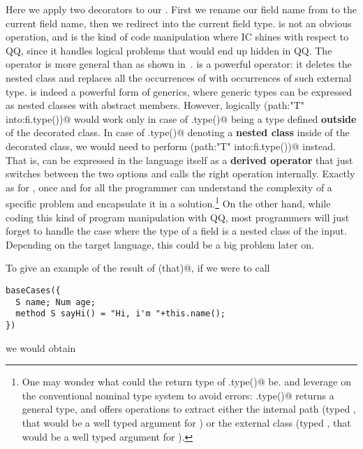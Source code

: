 \noindent Here we apply two decorators to our \Q@baseTrait@. First
we rename our field name from \Q@f@ to the current field name, then
 we redirect \Q@T@ into the current field type.
 \Q@RedirectType@ is not an obvious operation, and is the kind of code manipulation where IC shines
with respect to QQ, since it handles logical problems that would end up hidden in QQ.
 The operator \Q@RedirectType@ is more general than \Q@Redirect@ as shown in~\cite{servetto2014meta}.
 \Q@Redirect@ is a powerful operator:
 it deletes the nested class \Q@T@ and replaces all
 the occurrences of \Q@T@ with occurrences of such external type.
 \Q@Redirect@ is indeed a powerful form of generics,
 where generic types can be expressed as nested classes with abstract members.
 However, logically \Q@Redirect(path:"T" into:fi.type())@
 would work only in case of \Q@fi.type()@ being a type
 defined \textbf{outside} of the decorated class.
 In case of \Q@fi.type()@ denoting a \textbf{nested class} inside of the decorated class,
 we would need to perform \Q@Rename(path:"T" into:fi.type())@ instead.
 That is,
 \Q@RedirectType@ can be expressed in the language itself as a \textbf{derived operator}
 that just switches between the two options and calls the right operation internally.
Exactly as  for \Q@Stringable@, once and for all the programmer can understand
 the complexity of a specific problem and encapsulate it in a solution.\footnote{
One may wonder what could the return type of \Q@fi.type()@
be. \Q@Rename@ and \Q@Redirect@ leverage on the
conventional nominal type system to avoid errors:
 \Q@fi.type()@ returns a general \Q@Type@ type, and offers operations to extract either
 the internal path (typed \Q@Path@, that would be a well typed argument for \Q@Rename@)
 or the external class (typed \Q@Class@, that would be a well typed argument for \Q@Redirect@).}
 On the other hand, while coding this kind of program manipulation with QQ, most programmers
 will just forget to handle the case where the type of a field is a nested class of the input.
 Depending on the target language, this could be a big problem later on.


\noindent
To give an example of the result of \Q@baseCases(that)@, if we were to call 

\saveSpace
\begin{lstlisting}
baseCases({
  S name; Num age;
  method S sayHi() = "Hi, i'm "+this.name();
})
\end{lstlisting}
\saveSpace

\noindent
we would obtain

